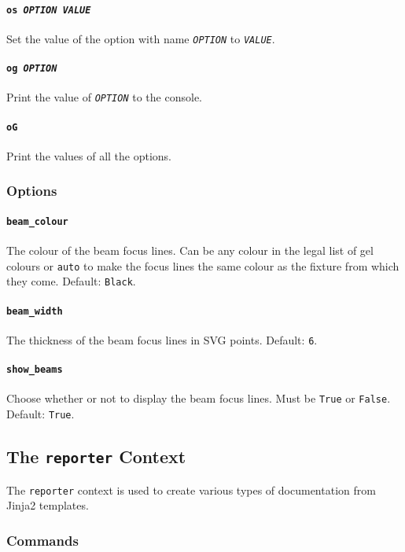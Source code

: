\documentclass[a4paper]{article}
\begin{document}
\paragraph{\texttt{os \textit{OPTION VALUE}}}
Set the value of the option with name \texttt{\textit{OPTION}} to 
\texttt{\textit{VALUE}}.

\paragraph{\texttt{og \textit{OPTION}}}
Print the value of \texttt{\textit{OPTION}} to the console.

\paragraph{\texttt{oG}}
Print the values of all the options.

\subsubsection{Options}

\paragraph{\texttt{beam\_colour}}
The colour of the beam focus lines. Can be any colour in the legal list of 
gel colours or \texttt{auto} to make the focus lines the same colour as the 
fixture from which they come. Default: \texttt{Black}.

\paragraph{\texttt{beam\_width}}
The thickness of the beam focus lines in SVG points. Default: \texttt{6}.

\paragraph{\texttt{show\_beams}}
Choose whether or not to display the beam focus lines. Must be \texttt{True} 
or \texttt{False}. Default: \texttt{True}.

\subsection{The \texttt{reporter} Context}
The \texttt{reporter} context is used to create various types of 
documentation from Jinja2 templates.

\subsubsection{Commands}
\end{document}
